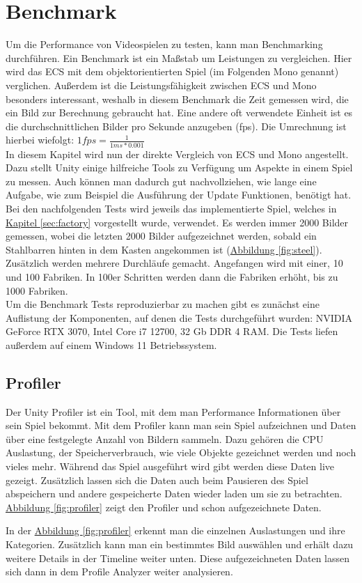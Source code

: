 \section{Benchmark}
Um die Performance von Videospielen zu testen, kann man Benchmarking durchführen. Ein Benchmark ist ein Maßstab um Leistungen zu vergleichen. Hier wird das ECS mit dem objektorientierten Spiel (im Folgenden Mono genannt) verglichen. Außerdem ist die Leistungsfähigkeit zwischen ECS und Mono besonders interessant, weshalb in diesem Benchmark die Zeit gemessen wird, die ein Bild zur Berechnung gebraucht hat. Eine andere oft verwendete Einheit ist es die durchschnittlichen Bilder pro Sekunde anzugeben (fps). Die Umrechnung ist hierbei wiefolgt: $1 fps = \frac{1}{1 ms * 0.001} $\\
In diesem Kapitel wird nun der direkte Vergleich von ECS und Mono angestellt. Dazu stellt Unity einige hilfreiche Tools zu Verfügung um Aspekte in einem Spiel zu messen. Auch können man dadurch gut nachvollziehen, wie lange eine Aufgabe, wie zum Beispiel die Ausführung der Update Funktionen, benötigt hat. Bei den nachfolgenden Tests wird jeweils das implementierte Spiel, welches in \hyperref[sec:factory]{Kapitel \ref*{sec:factory}} vorgestellt wurde, verwendet. Es werden immer 2000 Bilder gemessen, wobei die letzten 2000 Bilder aufgezeichnet werden, sobald ein Stahlbarren hinten in dem Kasten angekommen ist (\hyperref[fig:steel]{Abbildung \ref*{fig:steel}}). Zusätzlich werden mehrere Durchläufe gemacht. Angefangen wird mit einer, 10 und 100 Fabriken. In 100er Schritten werden dann die Fabriken erhöht, bis zu 1000 Fabriken.\\
Um die Benchmark Tests reproduzierbar zu machen gibt es zunächst eine Auflistung der Komponenten, auf denen die Tests durchgeführt wurden: NVIDIA GeForce RTX 3070, Intel Core i7 12700, 32 Gb DDR 4 RAM. Die Tests liefen außerdem auf einem Windows 11 Betriebssystem.
\subsection{Profiler}
Der Unity Profiler ist ein Tool, mit dem man Performance Informationen über sein Spiel bekommt. Mit dem Profiler kann man sein Spiel aufzeichnen und Daten über eine festgelegte Anzahl von Bildern sammeln. Dazu gehören die CPU Auslastung, der Speicherverbrauch, wie viele Objekte gezeichnet werden und noch vieles mehr. Während das Spiel ausgeführt wird gibt werden diese Daten live gezeigt. Zusätzlich lassen sich die Daten auch beim Pausieren des Spiel abspeichern und andere gespeicherte Daten wieder laden um sie zu betrachten. \hyperref[fig:profiler]{Abbildung \ref*{fig:profiler}} zeigt den Profiler und schon aufgezeichnete Daten. 

In der \hyperref[fig:profiler]{Abbildung \ref*{fig:profiler}} erkennt man die einzelnen Auslastungen und ihre Kategorien. Zusätzlich kann man ein bestimmtes Bild auswählen und erhält dazu weitere Details in der Timeline weiter unten. Diese aufgezeichneten Daten lassen sich dann in dem Profile Analyzer weiter analysieren.
